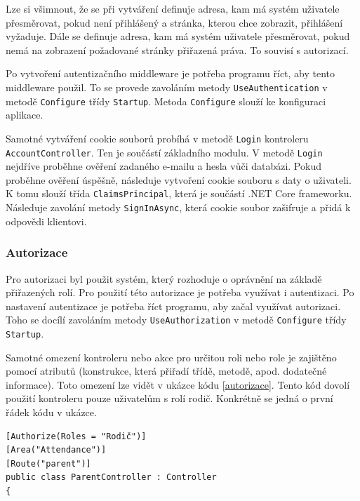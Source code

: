 Lze si všimnout, že se při vytváření definuje adresa, kam má systém uživatele přesměrovat, pokud není přihlášený a stránka, kterou chce zobrazit, přihlášení vyžaduje. Dále se definuje adresa, kam má systém uživatele přesměrovat, pokud nemá na zobrazení požadované stránky přiřazená práva. To souvisí s autorizací.

Po vytvoření autentizačního middleware je potřeba programu říct, aby tento middleware použil. To se provede zavoláním metody \texttt{UseAuthentication} v metodě \texttt{Configure} třídy \texttt{Startup}. Metoda \texttt{Configure} slouží ke konfiguraci aplikace.

Samotné vytváření cookie souborů probíhá v metodě \texttt{Login} kontroleru \texttt{AccountController}. Ten je součástí základního modulu. V metodě \texttt{Login} nejdříve proběhne ověření zadaného e-mailu a hesla vůči databázi. Pokud proběhne ověření úspěšně, následuje vytvoření cookie souboru s daty o uživateli. K tomu slouží třída \texttt{ClaimsPrincipal}, která je součástí .NET Core frameworku. Následuje zavolání metody \texttt{SignInAsync}, která cookie soubor zašifruje a přidá k odpovědi klientovi. \cite{cookie-autentizace}

\subsubsection*{Autorizace}
Pro autorizaci byl použit systém, který rozhoduje o oprávnění na základě přiřazených rolí. Pro použití této autorizace je potřeba využívat i autentizaci. Po nastavení autentizace je potřeba říct programu, aby začal využívat autorizaci. Toho se docílí zavoláním metody \texttt{UseAuthorization} v metodě \texttt{Configure} třídy \texttt{Startup}.

Samotné omezení kontroleru nebo akce pro určitou roli nebo role je zajištěno pomocí atributů (konstrukce, která přiřadí třídě, metodě, apod. dodatečné informace). Toto omezení lze vidět v ukázce kódu \ref{autorizace}. Tento kód dovolí použití kontroleru pouze uživatelům s rolí rodič. Konkrétně se jedná o první řádek kódu v ukázce.

\clearpage
\begin{listing}[h]
    \begin{verbatim}
[Authorize(Roles = "Rodič")]
[Area("Attendance")]
[Route("parent")]
public class ParentController : Controller
{
    \end{verbatim}
    \caption{Omezení použití kontroleru \texttt{ParentController} pro uživatele s rolí rodič}
    \label{autorizace}
\end{listing}

